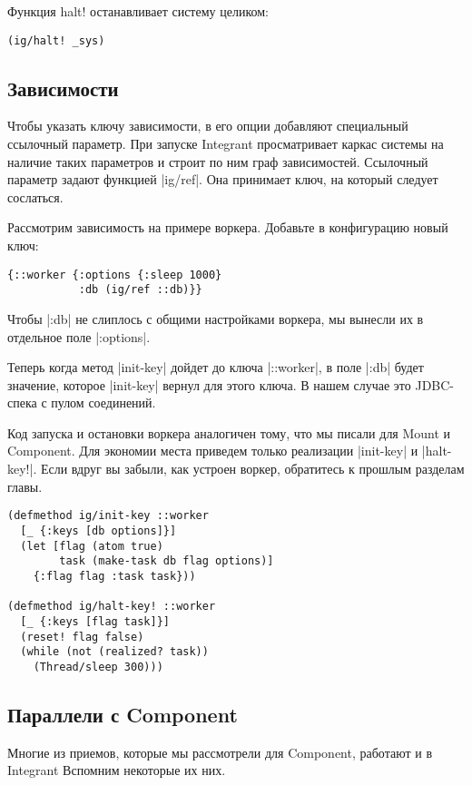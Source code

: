 Функция halt! останавливает систему целиком:

\begin{verbatim}
(ig/halt! _sys)
\end{verbatim}

\subsection{Зависимости}

Чтобы указать ключу зависимости, в его опции добавляют специальный ссылочный
параметр. При запуске Integrant просматривает каркас системы на наличие таких
параметров и строит по ним граф зависимостей. Ссылочный параметр задают функцией
\spverb|ig/ref|. Она принимает ключ, на который следует сослаться.

Рассмотрим зависимость на примере воркера. Добавьте в конфигурацию новый ключ:

\begin{verbatim}
{::worker {:options {:sleep 1000}
           :db (ig/ref ::db)}}
\end{verbatim}

Чтобы \spverb|:db| не слиплось с общими настройками воркера, мы вынесли их в отдельное
поле \spverb|:options|.

Теперь когда метод \spverb|init-key| дойдет до ключа \spverb|::worker|, в поле \spverb|:db| будет
значение, которое \spverb|init-key| вернул для этого ключа. В нашем случае это
JDBC-спека с пулом соединений.

Код запуска и остановки воркера аналогичен тому, что мы писали для Mount и
Component. Для экономии места приведем только реализации \spverb|init-key| и
\spverb|halt-key!|. Если вдруг вы забыли, как устроен воркер, обратитесь к прошлым
разделам главы.

\begin{verbatim}
(defmethod ig/init-key ::worker
  [_ {:keys [db options]}]
  (let [flag (atom true)
        task (make-task db flag options)]
    {:flag flag :task task}))

(defmethod ig/halt-key! ::worker
  [_ {:keys [flag task]}]
  (reset! flag false)
  (while (not (realized? task))
    (Thread/sleep 300)))
\end{verbatim}

\subsection{Параллели с Component}

Многие из приемов, которые мы рассмотрели для Component, работают и в Integrant
Вспомним некоторые их них.

